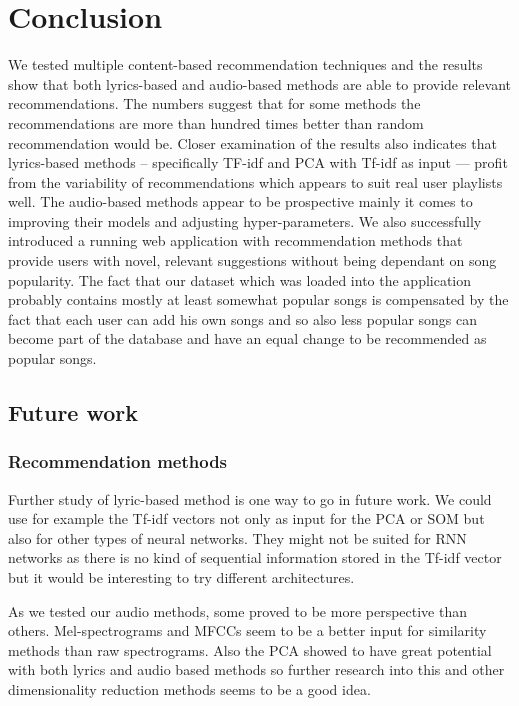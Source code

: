 \chapter*{Conclusion}
We tested multiple content-based recommendation techniques and the results show that both lyrics-based and audio-based methods are able to provide relevant recommendations. The numbers suggest that for some methods the recommendations are more than hundred times better than random recommendation would be. Closer examination of the results also indicates that lyrics-based methods -- specifically TF-idf and PCA with Tf-idf as input --- profit from the variability of recommendations which appears to suit real user playlists well. The audio-based methods appear to be prospective mainly it comes to improving their models and adjusting hyper-parameters. 
We also successfully introduced a running web application with recommendation methods that provide users with novel, relevant suggestions without being dependant on song popularity. The fact that our dataset which was loaded into the application probably contains mostly at least somewhat popular songs is compensated by the fact that each user can add his own songs and so also less popular songs can become part of the database and have an equal change to be recommended as popular songs. \\

\section*{Future work}
\subsection*{Recommendation methods}
Further study of lyric-based method is one way to go in future work. We could use for example the Tf-idf vectors not only as input for the PCA or SOM but also for other types of neural networks. They might not be suited for RNN networks as there is no kind of sequential information stored in the Tf-idf vector but it would be interesting to try different architectures.

As we tested our audio methods, some proved to be more perspective than others. Mel-spectrograms and MFCCs seem to be a better input for similarity methods than raw spectrograms. Also the PCA showed to have great potential with both lyrics and audio based methods so further research into this  and other dimensionality reduction methods seems to be a good idea. 

